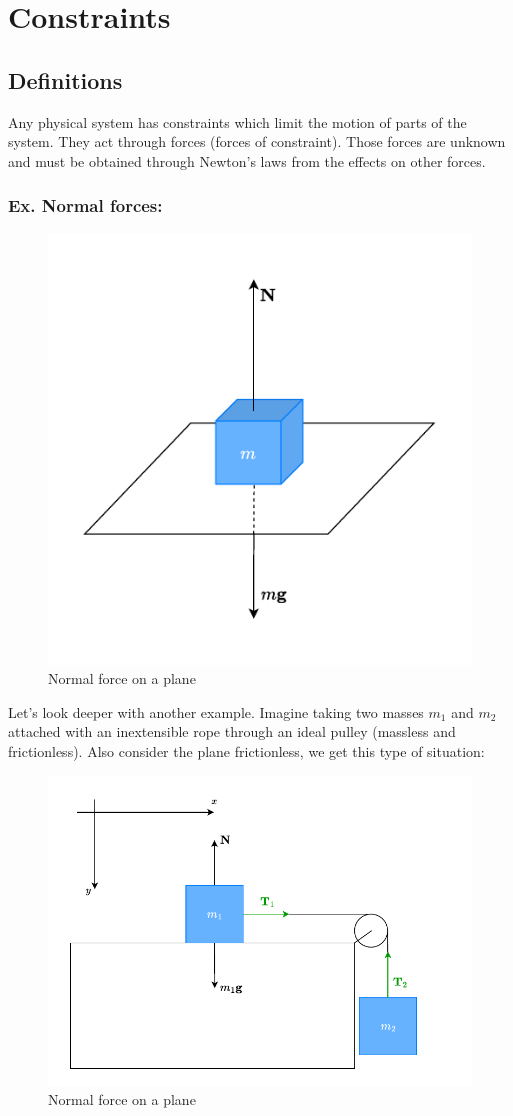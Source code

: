 \chapter{Constraints}
\section{Definitions}
Any physical system has constraints which limit the motion of parts of the system. They act through forces (forces of constraint). Those forces are unknown and must be obtained through Newton's laws from the effects on other forces.\\
\subsection{\textbf{Ex.} Normal forces:}
\begin{figure}[H]
    \centering
    \includegraphics[width=0.5\linewidth]{res/svg/normalforce.drawio}
    \caption{Normal force on a plane}
    \label{fig:image6}
\end{figure}
Let's look deeper with another example. Imagine taking two masses $m_1$ and $m_2$ attached with an inextensible rope through an ideal pulley (massless and frictionless). Also consider the plane frictionless, we get this type of situation:
\begin{figure}[H]
    \centering
    \includegraphics[width=0.6\linewidth]{res/svg/idealpulley.drawio}
    \caption{Normal force on a plane}
    \label{fig:image7}
\end{figure}
